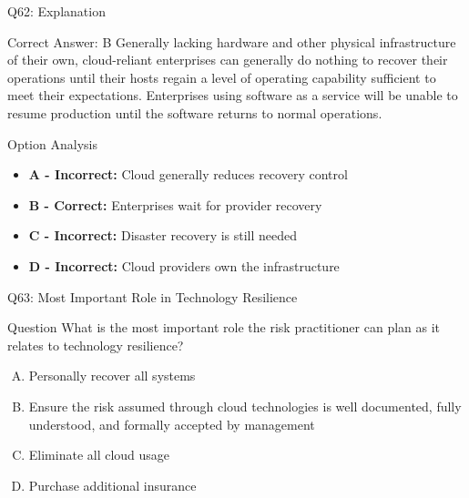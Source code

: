 \documentclass{beamer}
\begin{document}
	\begin{frame}{Q62: Explanation}
		\begin{block}{Correct Answer: B}
			Generally lacking hardware and other physical infrastructure of their own, cloud-reliant enterprises can generally do nothing to recover their operations until their hosts regain a level of operating capability sufficient to meet their expectations. Enterprises using software as a service will be unable to resume production until the software returns to normal operations.
		\end{block}
		\begin{block}{Option Analysis}
			\begin{itemize}
				\item \textbf{A - Incorrect:} Cloud generally reduces recovery control
				\item \textbf{B - Correct:} Enterprises wait for provider recovery
				\item \textbf{C - Incorrect:} Disaster recovery is still needed
				\item \textbf{D - Incorrect:} Cloud providers own the infrastructure
			\end{itemize}
		\end{block}
	\end{frame}
	
	\begin{frame}{Q63: Most Important Role in Technology Resilience}
		\begin{block}{Question}
			What is the most important role the risk practitioner can plan as it relates to technology resilience?
		\end{block}
		\begin{enumerate}[(A)]
			\item Personally recover all systems
			\item Ensure the risk assumed through cloud technologies is well documented, fully understood, and formally accepted by management
			\item Eliminate all cloud usage
			\item Purchase additional insurance
		\end{enumerate}
	\end{frame}
	
\end{document}
